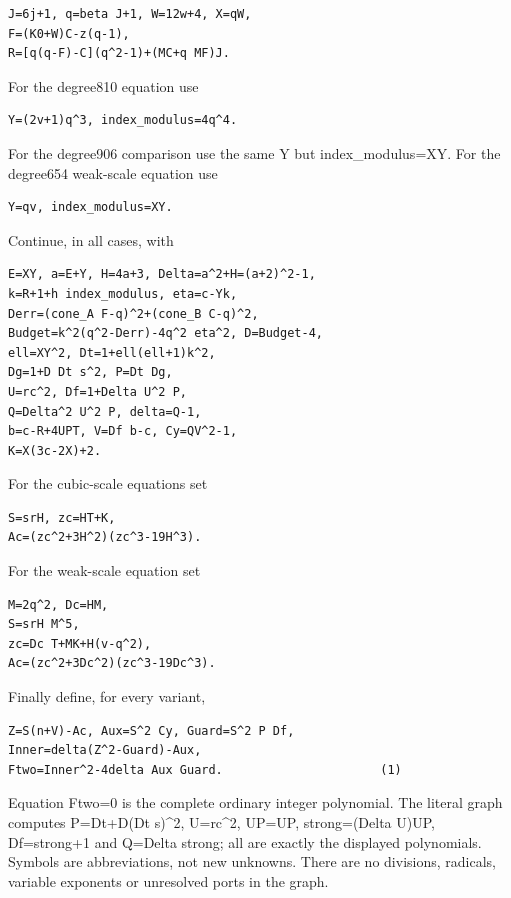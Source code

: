 \begin{verbatim}
J=6j+1, q=beta J+1, W=12w+4, X=qW,
F=(K0+W)C-z(q-1),
R=[q(q-F)-C](q^2-1)+(MC+q MF)J.
\end{verbatim}

For the degree810 equation use



\begin{verbatim}
Y=(2v+1)q^3, index_modulus=4q^4.
\end{verbatim}

For the degree906 comparison use the same Y but index\_\allowbreak{}modulus=\allowbreak{}XY. For the degree654 weak-scale equation use



\begin{verbatim}
Y=qv, index_modulus=XY.
\end{verbatim}

Continue, in all cases, with



\begin{verbatim}
E=XY, a=E+Y, H=4a+3, Delta=a^2+H=(a+2)^2-1,
k=R+1+h index_modulus, eta=c-Yk,
Derr=(cone_A F-q)^2+(cone_B C-q)^2,
Budget=k^2(q^2-Derr)-4q^2 eta^2, D=Budget-4,
ell=XY^2, Dt=1+ell(ell+1)k^2,
Dg=1+D Dt s^2, P=Dt Dg,
U=rc^2, Df=1+Delta U^2 P,
Q=Delta^2 U^2 P, delta=Q-1,
b=c-R+4UPT, V=Df b-c, Cy=QV^2-1,
K=X(3c-2X)+2.
\end{verbatim}

For the cubic-scale equations set



\begin{verbatim}
S=srH, zc=HT+K,
Ac=(zc^2+3H^2)(zc^3-19H^3).
\end{verbatim}

For the weak-scale equation set



\begin{verbatim}
M=2q^2, Dc=HM,
S=srH M^5,
zc=Dc T+MK+H(v-q^2),
Ac=(zc^2+3Dc^2)(zc^3-19Dc^3).
\end{verbatim}

Finally define, for every variant,



\begin{verbatim}
Z=S(n+V)-Ac, Aux=S^2 Cy, Guard=S^2 P Df,
Inner=delta(Z^2-Guard)-Aux,
Ftwo=Inner^2-4delta Aux Guard.                      (1)
\end{verbatim}

Equation Ftwo=\allowbreak{}0 is the complete ordinary integer polynomial. The literal graph computes P=\allowbreak{}Dt+\allowbreak{}D(Dt s)\textasciicircum{}\allowbreak{}2, U=\allowbreak{}rc\textasciicircum{}\allowbreak{}2, UP=\allowbreak{}UP, strong=\allowbreak{}(Delta U)UP, Df=\allowbreak{}strong+\allowbreak{}1 and Q=\allowbreak{}Delta strong; all are exactly the displayed polynomials. Symbols are abbreviations, not new unknowns. There are no divisions, radicals, variable exponents or unresolved ports in the graph.



